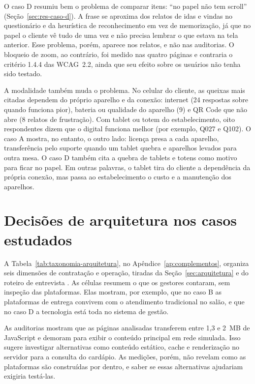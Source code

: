 O caso D resumiu bem o problema de comparar itens: ``no papel não tem scroll'' (Seção~\ref{sec:res-caso-d}). A frase se aproxima dos relatos de idas e vindas no questionário e da heurística de reconhecimento em vez de memorização, já que no papel o cliente vê tudo de uma vez e não precisa lembrar o que estava na tela anterior. Esse problema, porém, aparece nos relatos, e não nas auditorias. O bloqueio de zoom, ao contrário, foi medido nas quatro páginas e contraria o critério 1.4.4 das WCAG~2.2, ainda que seu efeito sobre os usuários não tenha sido testado.

A modalidade também muda o problema. No celular do cliente, as queixas mais citadas dependem do próprio aparelho e da conexão: internet (24 respostas sobre quando funciona pior), bateria ou qualidade do aparelho (9) e QR Code que não abre (8 relatos de frustração). Com tablet ou totem do estabelecimento, oito respondentes dizem que o digital funciona melhor (por exemplo, Q027 e Q102). O caso A mostra, no entanto, o outro lado: licença presa a cada aparelho, transferência pelo suporte quando um tablet quebra e aparelhos levados para outra mesa. O caso D também cita a quebra de tablets e totens como motivo para ficar no papel. Em outras palavras, o tablet tira do cliente a dependência da própria conexão, mas passa ao estabelecimento o custo e a manutenção dos aparelhos.

\section{Decisões de arquitetura nos casos estudados}
\label{sec:disc-arquitetura}

A Tabela~\ref{tab:taxonomia-arquitetura}, no Apêndice~\ref{ap:complementos}, organiza seis dimensões de contratação e operação, tiradas da Seção~\ref{sec:arquitetura} e do roteiro de entrevista \cite{bass2021software,richards2020fundamentals}. As células resumem o que os gestores contaram, sem inspeção das plataformas. Elas mostram, por exemplo, que no caso B as plataformas de entrega convivem com o atendimento tradicional no salão, e que no caso D a tecnologia está toda no sistema de gestão.

As auditorias mostram que as páginas analisadas transferem entre 1,3 e 2~MB de JavaScript e demoram para exibir o conteúdo principal em rede simulada. Isso sugere investigar alternativas como conteúdo estático, cache e renderização no servidor para a consulta do cardápio. As medições, porém, não revelam como as plataformas são construídas por dentro, e saber se essas alternativas ajudariam exigiria testá-las.

